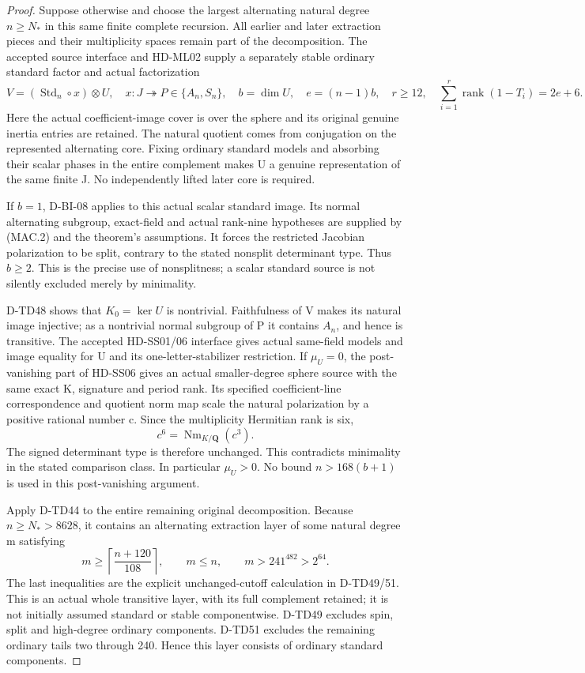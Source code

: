 \begin{proof}
Suppose otherwise and choose the largest alternating natural degree
\(n\ge N_*\) in this same finite complete recursion. All earlier and
later extraction pieces and their multiplicity spaces remain part of
the decomposition. The accepted source interface and HD-ML02 supply
a separately stable ordinary standard factor and actual factorization
\[
 V=(\operatorname{Std}_n\circ x)\otimes U,
 \quad x:J\twoheadrightarrow P\in\{A_n,S_n\},
 \quad b=\dim U,\quad e=(n-1)b,
 \quad r\ge12,\quad
 \sum_{i=1}^r\operatorname{rank}(1-T_i)=2e+6.
 \tag{MAC.2}
\]
Here the actual coefficient-image cover is over the sphere and its
original genuine inertia entries are retained. The natural quotient
comes from conjugation on the represented alternating core.
Fixing ordinary standard models and absorbing their scalar phases
in the entire complement makes U a genuine representation of the
same finite J. No independently lifted later core is required.

If \(b=1\), D-BI-08 applies to this actual scalar standard image.
Its normal alternating subgroup, exact-field and actual rank-nine
hypotheses are supplied by (MAC.2) and the theorem's assumptions.
It forces the restricted Jacobian polarization to be split,
contrary to the stated nonsplit determinant type. Thus \(b\ge2\).
This is the precise use of nonsplitness; a scalar standard source
is not silently excluded merely by minimality.

D-TD48 shows that \(K_0=\ker U\) is nontrivial. Faithfulness of V
makes its natural image injective; as a nontrivial normal subgroup
of P it contains \(A_n\), and hence is transitive. The accepted
HD-SS01/06 interface gives actual same-field models and image equality
for U and its one-letter-stabilizer restriction. If \(\mu_U=0\),
the post-vanishing part of HD-SS06 gives an actual smaller-degree
sphere source with the same exact K, signature and period rank.
Its specified coefficient-line correspondence and quotient norm map
scale the natural polarization by a positive rational number c.
Since the multiplicity Hermitian rank is six,
\[
                    c^6=\operatorname{Nm}_{K/\mathbf Q}(c^3).
 \tag{MAC.3}
\]
The signed determinant type is therefore unchanged. This contradicts
minimality in the stated comparison class. In particular \(\mu_U>0\).
No bound \(n>168(b+1)\) is used in this post-vanishing argument.

Apply D-TD44 to the entire remaining original decomposition. Because
\(n\ge N_*>8628\), it contains an alternating extraction layer
of some natural degree m satisfying
\[
 m\ge\left\lceil\frac{n+120}{108}\right\rceil,
 \qquad m\le n,\qquad
                 m>241^{482}>2^{64}.
 \tag{MAC.4}
\]
The last inequalities are the explicit unchanged-cutoff calculation
in D-TD49/51. This is an actual whole transitive layer, with its full
complement retained; it is not initially assumed standard or stable
componentwise. D-TD49 excludes spin, split and high-degree ordinary
components. D-TD51 excludes the remaining ordinary tails two through
240. Hence this layer consists of ordinary standard components.


\end{proof}
